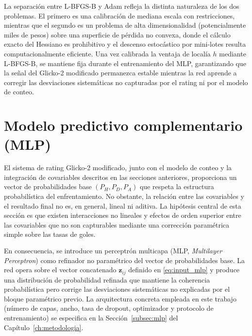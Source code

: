 La separaci\'on entre L-BFGS-B y Adam refleja la distinta naturaleza de los dos problemas. El primero es una calibraci\'on de mediana escala con restricciones, mientras que el segundo es un problema de alta dimensionalidad (potencialmente miles de pesos) sobre una superficie de p\'erdida no convexa, donde el c\'alculo exacto del Hessiano es prohibitivo y el descenso estoc\'astico por mini-lotes resulta computacionalmente eficiente. Una vez calibrada la ventaja de local\'ia $h$ mediante L-BFGS-B, se mantiene fija durante el entrenamiento del MLP, garantizando que la se\~nal del Glicko-2 modificado permanezca estable mientras la red aprende a corregir las desviaciones sistem\'aticas no capturadas por el rating ni por el modelo de conteo.


\section{Modelo predictivo complementario (MLP)}
\label{sec:mlp}

El sistema de rating Glicko-2 modificado, junto con el modelo de conteo y la integraci\'on de covariables descritos en las secciones anteriores, proporciona un vector de probabilidades base $(P_H, P_D, P_A)$ que respeta la estructura probabil\'istica del enfrentamiento. No obstante, la relaci\'on entre las covariables y el resultado final no es, en general, lineal ni aditiva. La hip\'otesis central de esta secci\'on es que existen interacciones no lineales y efectos de orden superior entre las covariables que no son capturables mediante una correcci\'on param\'etrica simple sobre las tasas de goles.

En consecuencia, se introduce un perceptr\'on multicapa (MLP, \emph{Multilayer Perceptron}) como refinador no param\'etrico del vector de probabilidades base. La red opera sobre el vector concatenado $\mathbf{z}_{ij}$ definido en \eqref{eq:input_mlp} y produce una distribuci\'on de probabilidad refinada que mantiene la coherencia probabil\'istica pero corrige las desviaciones sistem\'aticas no explicadas por el bloque param\'etrico previo. La arquitectura concreta empleada en este trabajo (n\'umero de capas, ancho, tasa de dropout, optimizador y protocolo de entrenamiento) se especifica en la Secci\'on~\ref{subsec:mlp} del Cap\'itulo~\ref{ch:metodologia}.


